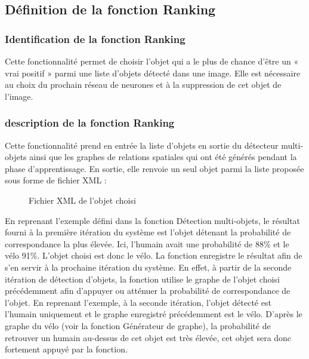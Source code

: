 \documentclass[debug,nodate,hideweeklyreports,noposter]{polytech/polytech}
\begin{document}
\subsection{Définition de la fonction Ranking}

\subsubsection{Identification de la fonction Ranking}

Cette fonctionnalité permet de choisir l’objet qui a le plus de chance d’être un « vrai positif » parmi une liste d’objets détecté dans une image. Elle est nécessaire au choix du prochain réseau de neurones et à la suppression de cet objet de l’image.

\subsubsection{description de la fonction Ranking}

Cette fonctionnalité prend en entrée la liste d’objets en sortie du détecteur multi-objets ainsi que les graphes de relations spatiales qui ont été générés pendant la phase d’apprentissage. En sortie, elle renvoie un seul objet parmi la liste proposée sous forme de fichier XML :

\begin{figure}
  \caption{Fichier XML de l'objet choisi}
  \label{fig:chosenxml}
\end{figure}

En reprenant l’exemple défini dans la fonction Détection multi-objets, le résultat fourni à la première itération du système est l’objet détenant la probabilité de correspondance la plus élevée. Ici, l’humain avait une probabilité de 88\% et le vélo 91\%. L’objet choisi est donc le vélo. La fonction enregistre le résultat afin de s’en servir à la prochaine itération du système. 
En effet, à partir de la seconde itération de détection d’objets, la fonction utilise le graphe de l’objet choisi précédemment afin d’appuyer ou atténuer la probabilité de correspondance de l’objet.
En reprenant l’exemple, à la seconde itération, l’objet détecté est l’humain uniquement et le graphe enregistré précédemment est le vélo. D’après le graphe du vélo (voir la fonction Générateur de graphe), la probabilité de retrouver un humain au-dessus de cet objet est très élevée, cet objet sera donc fortement appuyé par la fonction.
\end{document}
